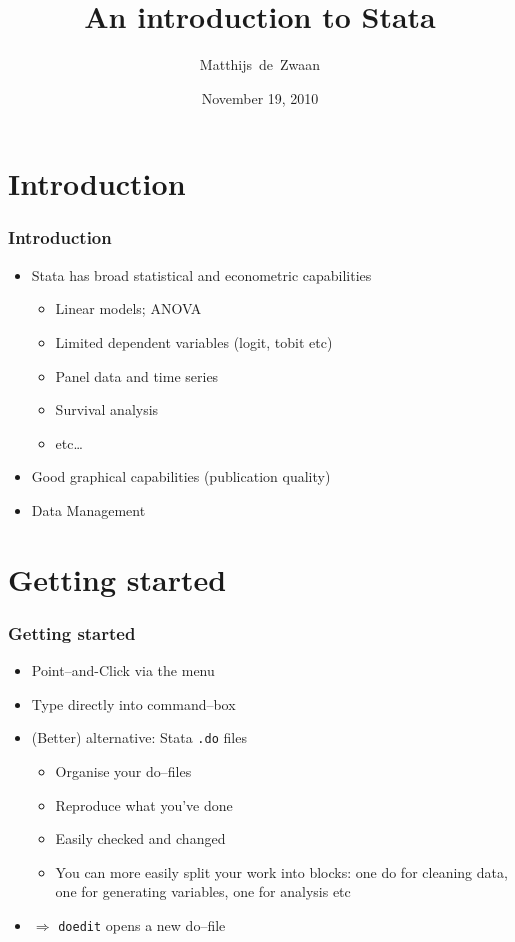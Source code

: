 \documentclass[pdftex, compress]{beamer}
\title{An introduction to Stata}
\author{Matthijs~de~Zwaan}
\institute{\,}
\date{November 19, 2010}
\begin{document}
\begin{frame}
\titlepage
\end{frame}
\section{Introduction}

\begin{frame}
\frametitle{Introduction}
\begin{itemize}
	\item Stata has broad statistical and econometric capabilities
	\begin{itemize}
		\item Linear models; ANOVA
		\item Limited dependent variables (logit, tobit etc)
		\item Panel data and time series
		\item Survival analysis
		\item etc\dots
	\end{itemize}
	\item Good graphical capabilities (publication quality)
	\item Data Management
\end{itemize}
\end{frame}
\section{Getting started}
\begin{frame}
\frametitle{Getting started}
\begin{itemize}
	\item Point--and-Click via the menu
	\item Type directly into command--box
	\item (Better) alternative: Stata \texttt{.do} files
	\begin{itemize}
		\item Organise your do--files
		\item \alert{Reproduce} what you've done
		\item Easily checked and changed
		\item You can more easily split your work into blocks: one do for cleaning data, one for generating variables, one for analysis etc
	\end{itemize}
	\item[] $\Rightarrow$ \texttt{doedit} opens a new do--file	
\end{itemize}
\end{frame}
\end{document}
